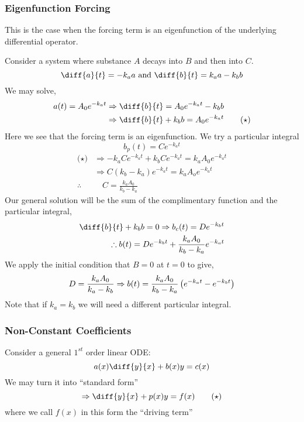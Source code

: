 \documentclass{article}
\begin{document}
\subsubsection*{Eigenfunction Forcing}
This is the case when the forcing term is an eigenfunction of the underlying differential operator.
\begin{eg}
    Consider a system where substance $A$ decays into $B$ and then into $C$.
    \[
        \diff{a}{t} = - k_a a \text{ and } \diff{b}{t} = k_a a - k_b b   
    \]
    We may solve,
    \begin{align*}
        a(t) = A_0 e^{-k_a t} &\Rightarrow \diff{b}{t} = A_0 e^{-k_a t} - k_b b \\
        &\Rightarrow \diff{b}{t} +  k_b b = A_0 e^{-k_a t} \tag{$\star$}
    \end{align*}
    Here we see that the forcing term is an eigenfunction. 
    We try a particular integral
    \[
        b_p(t) = C e^{-k_a t}  
    \]
    \begin{align*}
        \text{($\star$)} &\Rightarrow -k_a Ce^{-k_a t} + k_b C e^{-k_a t} = k_a A_0 e^{-k_a t} \\
        &\Rightarrow C(k_b - k_a) e^{-k_a t} = k_a A_o e^{-k_a t} \\
        \therefore & \quad C = \frac{k_a A_0}{k_b - k_a} \tag{$k_b \neq k_a$}
    \end{align*}
    Our general solution will be the sum of the complimentary function and the particular integral,
    \begin{align*}
        \diff{b}{t} +  k_b b = 0 \Rightarrow b_c(t) = D e^{-k_b t} \\
        \therefore b(t) = D e^{-k_b t} +  \frac{k_a A_0}{k_b - k_a} e^{-k_a t}  
    \end{align*}
    We apply the initial condition that $B = 0$ at $t = 0$ to give,
    \[
        D = \frac{k_a A_0}{k_a - k_b} \Rightarrow b(t) = \frac{k_a A_0}{k_b - k_a}\left( e^{-k_a t} - e^{-k_b t} \right)
    \]
    Note that if $k_a = k_b$ we will need a different particular integral.
\end{eg}
\subsubsection{Non-Constant Coefficients}
Consider a general $1^{st}$ order linear ODE:
\[
    a(x) \diff{y}{x} + b(x)y = c(x)
\]
We may turn it into ``standard form''
\[
    \Rightarrow \diff{y}{x} + p(x)y = f(x) \tag{$\star$}
\]
where we call $f(x)$ in this form the ``driving term''
\end{document}
